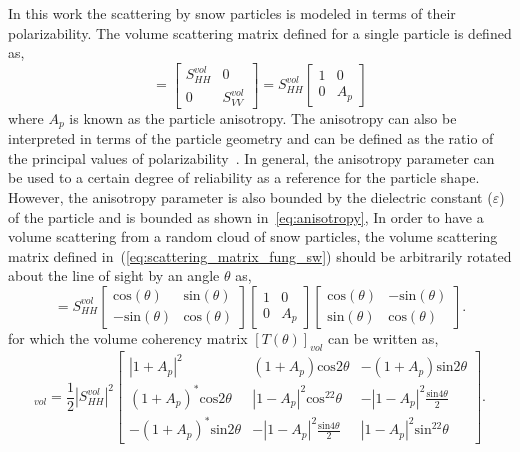In this work the scattering by snow particles is modeled in terms of their polarizability. The volume scattering matrix defined for a single particle is defined as,
\begin{equation}
[S_{vol}]=\left[\begin{array}{cc}
S_{HH}^{vol} & 0 \\
0 & S_{VV}^{vol}
\end{array}\right] = S_{HH}^{vol}\left[\begin{array}{cc}
1 & 0 \\
0 & A_{p}
\end{array}\right]
\label{eq:scattering_matrix_fung_sw}
\end{equation}
where $A_{p}$ is known as the particle anisotropy. The anisotropy can also be interpreted in terms of the particle geometry and can be defined as the ratio of the principal values of polarizability~\cite{cloude2009polarisation}. In general, the anisotropy parameter can be used to a certain degree of reliability as a reference for the particle shape. However, the anisotropy parameter is also bounded by the dielectric constant ($\varepsilon$) of the particle and is bounded as shown in~\ref{eq:anisotropy},
In order to have a volume scattering from a random cloud of snow particles, the volume scattering matrix defined in~(\ref{eq:scattering_matrix_fung_sw}) should be arbitrarily rotated about the line of sight by an angle $\theta$ as,
\begin{equation}
[S_{vol}]=S_{HH}^{vol}\left[\begin{array}{cc}
\mbox{cos}(\theta) & \mbox{sin}(\theta) \\
-\mbox{sin}(\theta) & \mbox{cos}(\theta)
\end{array}\right]\left[\begin{array}{cc}
1 & 0 \\
0 & A_{p}
\end{array}\right]\left[\begin{array}{cc}
\mbox{cos}(\theta) & -\mbox{sin}(\theta) \\
\mbox{sin}(\theta) & \mbox{cos}(\theta)
\end{array}\right].
\label{eq:rotated_volume_scattering_matrix_sw}
\end{equation}
for which the volume coherency matrix $[T(\theta)]_{vol}$ can be written as,
\begin{equation}
[T(\theta)]_{vol}=\frac{1}{2}\left|S_{HH}^{vol}\right|^2\left[\begin{array}{ccc}
|1+A_{p}|^2 & (1 + A_{p})\mbox{cos}2\theta & -(1 + A_{p})\mbox{sin}2\theta    \\
(1 + A_{p})^*\mbox{cos}2\theta & |1-A_{p}|^2\mbox{cos}^22\theta  & -|1-A_{p}|^2\frac{\mbox{sin}4\theta}{2}   \\ 
-(1 + A_{p})^*\mbox{sin}2\theta & -|1-A_{p}|^2\frac{\mbox{sin}4\theta}{2} & |1-A_{p}|^2\mbox{sin}^22\theta
\end{array}\right].
\label{eq:coh_matrix_sp_sw}
\end{equation}
